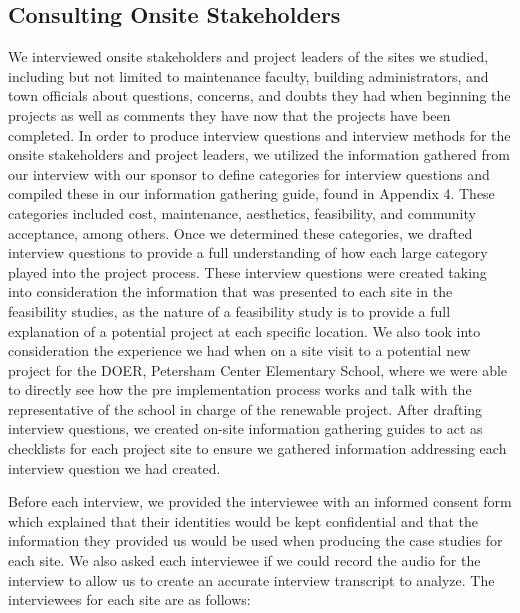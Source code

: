     \subsection{Consulting Onsite Stakeholders}
    \par We interviewed onsite stakeholders and project leaders of the sites we studied, including but not limited to maintenance faculty, building administrators, and town officials about questions, concerns, and doubts they had when beginning the projects as well as comments they have now that the projects have been completed. In order to produce interview questions and interview methods for the onsite stakeholders and project leaders, we utilized the information gathered from our interview with our sponsor to define categories for interview questions and compiled these in our information gathering guide, found in Appendix 4. These categories included cost, maintenance, aesthetics, feasibility, and community acceptance, among others. Once we determined these categories, we drafted interview questions to provide a full understanding of how each large category played into the project process. These interview questions were created taking into consideration the information that was presented to each site in the feasibility studies, as the nature of a feasibility study is to provide a full explanation of a potential project at each specific location. We also took into consideration the experience we had when on a site visit to a potential new project for the DOER, Petersham Center Elementary School, where we were able to directly see how the pre implementation process works and talk with the representative of the school in charge of the renewable project. After drafting interview questions, we created on-site information gathering guides to act as checklists for each project site to ensure we gathered information addressing each interview question we had created.
    \par Before each interview, we provided the interviewee with an informed consent form which explained that their identities would be kept confidential and that the information they provided us would be used when producing the case studies for each site. We also asked each interviewee if we could record the audio for the interview to allow us to create an accurate interview transcript to analyze. The interviewees for each site are as follows:
